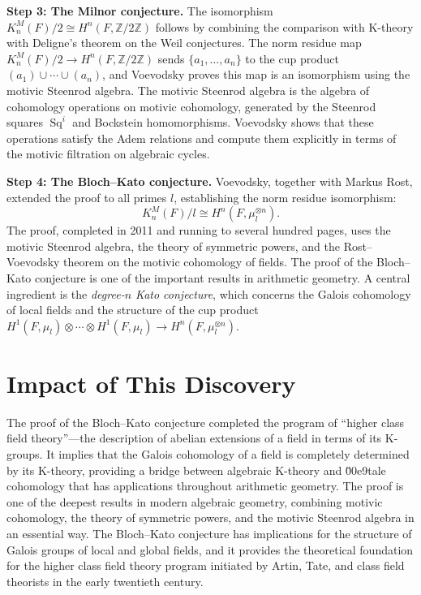 \textbf{Step 3: The Milnor conjecture.} The isomorphism $K^M_n(F)/2 \cong H^n(F, \mathbb{Z}/2\mathbb{Z})$ follows by combining the comparison with K-theory with Deligne's theorem on the Weil conjectures. The norm residue map $K^M_n(F)/2 \to H^n(F, \mathbb{Z}/2\mathbb{Z})$ sends $\{a_1, \ldots, a_n\}$ to the cup product $(a_1) \cup \cdots \cup (a_n)$, and Voevodsky proves this map is an isomorphism using the motivic Steenrod algebra. The motivic Steenrod algebra is the algebra of cohomology operations on motivic cohomology, generated by the Steenrod squares $\operatorname{Sq}^i$ and Bockstein homomorphisms. Voevodsky shows that these operations satisfy the Adem relations and compute them explicitly in terms of the motivic filtration on algebraic cycles.

\textbf{Step 4: The Bloch--Kato conjecture.} Voevodsky, together with Markus Rost, extended the proof to all primes $l$, establishing the norm residue isomorphism:
\[
K^M_n(F)/l \cong H^n(F, \mu_l^{\otimes n}).
\]
The proof, completed in 2011 and running to several hundred pages, uses the motivic Steenrod algebra, the theory of symmetric powers, and the Rost--Voevodsky theorem on the motivic cohomology of fields. The proof of the Bloch--Kato conjecture is one of the important results in arithmetic geometry. A central ingredient is the \emph{degree-$n$ Kato conjecture}, which concerns the Galois cohomology of local fields and the structure of the cup product $H^1(F, \mu_l) \otimes \cdots \otimes H^1(F, \mu_l) \to H^n(F, \mu_l^{\otimes n})$.

\section{Impact of This Discovery}

The proof of the Bloch--Kato conjecture completed the program of ``higher class field theory''---the description of abelian extensions of a field in terms of its K-groups. It implies that the Galois cohomology of a field is completely determined by its K-theory, providing a bridge between algebraic K-theory and \u00e9tale cohomology that has applications throughout arithmetic geometry. The proof is one of the deepest results in modern algebraic geometry, combining motivic cohomology, the theory of symmetric powers, and the motivic Steenrod algebra in an essential way. The Bloch--Kato conjecture has implications for the structure of Galois groups of local and global fields, and it provides the theoretical foundation for the higher class field theory program initiated by Artin, Tate, and class field theorists in the early twentieth century.

